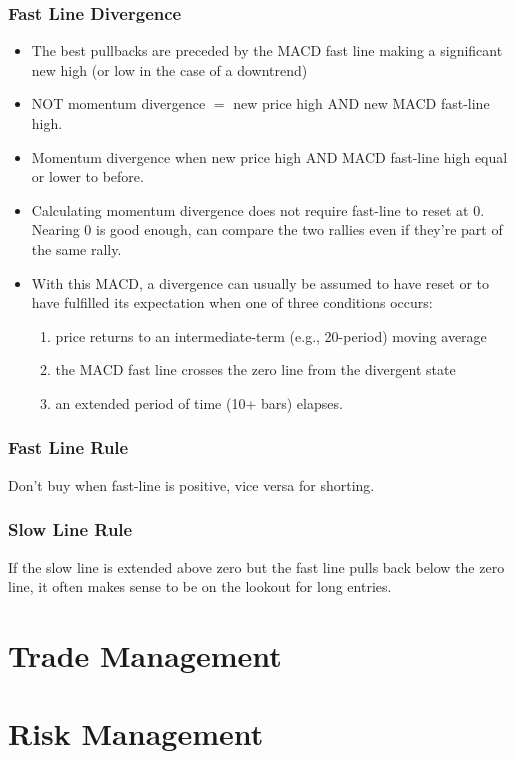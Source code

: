 \documentclass{../notes}
\begin{document}
\subsubsection{Fast Line Divergence}
\begin{itemize}
  \item The best pullbacks are preceded by the MACD fast line making a significant new high (or low in the case of a downtrend)
  \item NOT momentum divergence $=$ new price high AND new MACD fast-line high.
  \item Momentum divergence when new price high AND MACD fast-line high equal or lower to before.
  \item Calculating momentum divergence does not require fast-line to reset at 0. Nearing 0 is good enough, can compare the two rallies even if they're part of the same rally.
  \item With this MACD, a divergence can usually be assumed to have reset or to have fulfilled its expectation when one of three conditions occurs:
  \begin{enumerate}
    \item price returns to an intermediate-term (e.g., 20-period) moving average
    \item the MACD fast line crosses the zero line from the divergent state
    \item an extended period of time (10+ bars) elapses.
  \end{enumerate}
\end{itemize}

\subsubsection{Fast Line Rule}
Don't buy when fast-line is positive, vice versa for shorting.

\subsubsection{Slow Line Rule}
If the slow line is extended above zero but the fast line pulls back below the zero line, it often makes sense to be on the lookout for long entries. 
\section{Trade Management}
\section{Risk Management}
\end{document}
